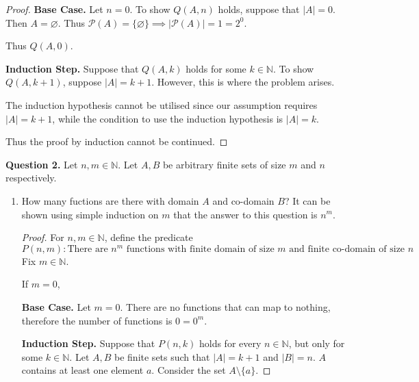 \documentclass[11pt]{article}
\begin{document}
\begin{enumerate}[label=\alph*)]
\begin{proof}
            \textbf{Base Case.} Let \(n=0\). To show \(Q(A, n)\) holds, suppose that \(\left\vert A \right\vert = 0\). Then \(A = \varnothing \). Thus \(\mathcal{P} (A) = \{ \varnothing  \} \implies \left\vert \mathcal{P} (A) \right\vert = 1 = 2^0 \).
            
            Thus \(Q(A, 0)\).

            \textbf{Induction Step.} Suppose that \(Q(A, k)\) holds for some \(k \in \mathbb{N}\). To show \(Q(A, k+1)\), suppose \(\left\vert A \right\vert = k+1\). However, this is where the problem arises. 

            The induction hypothesis cannot be utilised since our assumption requires \(\left\vert A \right\vert = k+1\), while the condition to use the induction hypothesis is \(\left\vert A \right\vert = k\).
            
            Thus the proof by induction cannot be continued.

        \end{proof}
    \end{enumerate}
    \noindent\textbf{Question 2.} Let \(n,m \in \mathbb{N}\). Let \(A, B\) be arbitrary finite sets of size \(m\) and \(n\) respectively.
    \begin{enumerate}[label=\alph*)]
        \item How many fuctions are there with domain \(A\) and co-domain \(B\)?
        It can be shown using simple induction on \(m\) that the answer to this question is \(n^m\).
        \begin{proof}
            For \(n,m \in \mathbb{N} \), define the predicate
            \[
                P(n,m) \colon \text{There are } n^m \text{ functions with finite domain of size } m \text{ and finite co-domain of size } n
            \]
            Fix \(m \in \mathbb{N}\).
            
            If \(m=0\), 

            \textbf{Base Case.} Let \(m = 0\). There are no functions that can map to nothing, therefore the number of functions is \(0 = 0^m\).

            \textbf{Induction Step.} Suppose that \(P(n, k)\) holds for every \(n \in \mathbb{N}\), but only for some \(k \in \mathbb{N}\). Let \(A, B\) be finite sets such that \(\left\vert A \right\vert = k+1\) and \(\left\vert B \right\vert = n\). \(A\) contains at least one element \(a\). Consider the set \(A\setminus\{a\}\).

        \end{proof}
    \end{enumerate}
\end{document}
